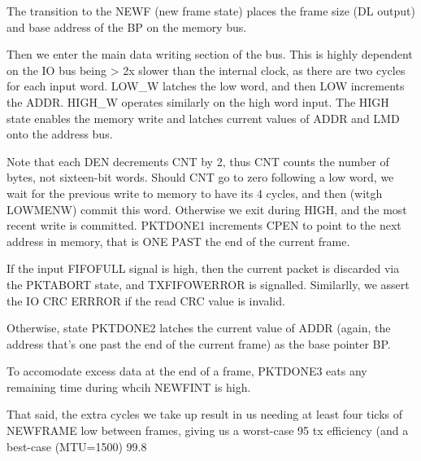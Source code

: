 The transition to the NEWF (new frame state) places the frame size (DL output) and base address of the BP on the memory bus.

Then we enter the main data writing section of the bus. This is highly
dependent on the IO bus being > 2x slower than the internal clock, as
there are two cycles for each input word. LOW_W latches the low word,
and then LOW increments the ADDR. HIGH_W operates similarly on the
high word input. The HIGH state enables the memory write and latches
current values of ADDR and LMD onto the address bus.

Note that each DEN decrements CNT by 2, thus CNT counts the number of
bytes, not sixteen-bit words. Should CNT go to zero following a low
word, we wait for the previous write to memory to have its 4 cycles,
and then (witgh LOWMENW) commit this word. Otherwise we exit during
HIGH, and the most recent write is committed. PKTDONE1 increments CPEN
to point to the next address in memory, that is ONE PAST the end of
the current frame.

If the input FIFOFULL signal is high, then the current packet is
discarded via the PKTABORT state, and TXFIFOWERROR is
signalled. Similarlly, we assert the IO CRC ERRROR if the read CRC value is invalid. 

Otherwise, state PKTDONE2 latches the current value of ADDR
(again, the address that's one past the end of the current frame) as
the base pointer BP.

To accomodate excess data at the end of a frame, PKTDONE3 eats any
remaining time during whcih NEWFINT is high.

That said, the extra cycles we take up result in us needing at least
four ticks of NEWFRAME low between frames, giving us a worst-case 95%
tx efficiency (and a best-case (MTU=1500) 99.8%
